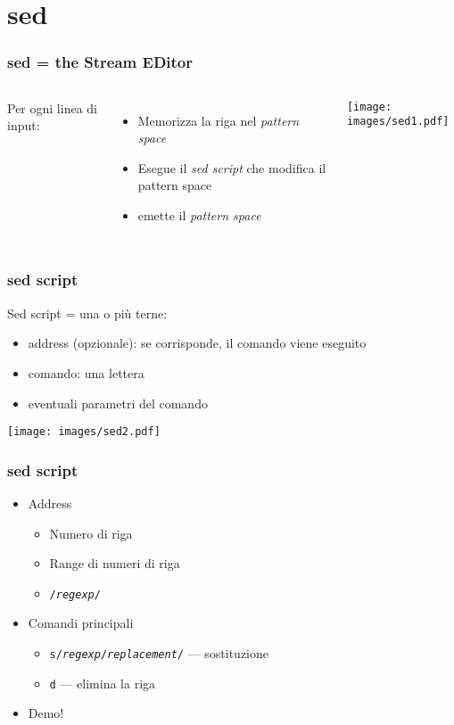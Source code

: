 \documentclass[xetex,table]{beamer}
\begin{document}
\section{sed}

\begin{frame}
  \frametitle{sed = the Stream EDitor}
  \begin{columns}
    Per ogni linea di input:
    \begin{itemize}
    \item Memorizza la riga nel {\em pattern space}
    \item Esegue il {\em sed script} che modifica il pattern space
    \item emette il {\em pattern space}
    \end{itemize}
    \begin{center}
      \texttt{[image: images/sed1.pdf]}
    \end{center}
  \end{columns}
\end{frame}

\begin{frame}
  \frametitle{sed script}
  Sed script = una o più terne:
  \begin{itemize}
  \item address (opzionale): se corrisponde, il comando viene eseguito
  \item comando: una lettera
  \item eventuali parametri del comando
  \end{itemize}
  \begin{center}
    \texttt{[image: images/sed2.pdf]}
  \end{center}
\end{frame}

\begin{frame}
  \frametitle{sed script}
  \begin{itemize}
  \item Address
    \begin{itemize}
    \item Numero di riga
    \item Range di numeri di riga
    \item \texttt{/{\em regexp}/}
    \end{itemize}
  \item Comandi principali
    \begin{itemize}
    \item \texttt{s/\emph{regexp}/\emph{replacement}/} --- sostituzione
    \item \texttt{d} --- elimina la riga
    \end{itemize}
  \item Demo!
  \end{itemize}
\end{frame}
\end{document}
